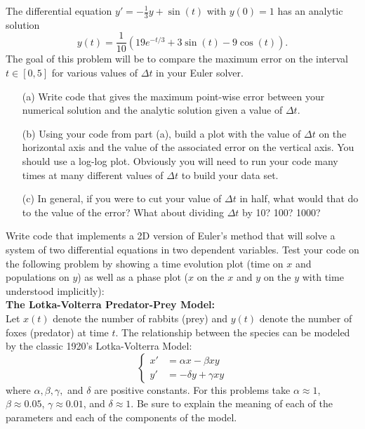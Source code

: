 \begin{problem}\label{prob:ode_error_analysis}
    The differential equation $y' = -\frac{1}{3}y + \sin(t)$ with $y(0) = 1$ has an
    analytic solution 
    \[ y(t) = \frac{1}{10} \left( 19 e^{-t/3} + 3\sin(t) - 9\cos(t) \right). \]
    The goal of this problem will be to compare the maximum error on the interval $t \in
    [0,5]$ for various values of $\Delta t$ in your Euler solver.
    \begin{enumerate}
        \item[(a)] Write code that gives the maximum point-wise error between your
            numerical solution and the analytic solution given a value of $\Delta t$.
        \item[(b)] Using your code from part (a), build a plot with the value of $\Delta
            t$ on the horizontal axis and the value of the associated error on the
            vertical axis.  You should use a log-log plot.  Obviously you will need to run
            your code many times at many different values of $\Delta t$ to build your data
            set.
        \item[(c)] In general, if you were to cut your value of $\Delta t$ in half, what
            would that do to the value of the error?  What about dividing $\Delta t$ by
            10?  100?  1000?
    \end{enumerate}
\end{problem}




\begin{problem}\label{prob:2dPredPrey}
    Write code that implements a 2D version of Euler's method that will solve a system of
    two differential equations in two dependent variables.  Test your code on the
    following problem by showing a time evolution plot (time on $x$ and populations on
    $y$) as well as a phase plot ($x$ on the $x$ and $y$ on the $y$ with time understood
    implicitly):\\
    {\bf The Lotka-Volterra Predator-Prey Model:}\\
    Let $x(t)$ denote the number of rabbits (prey) and $y(t)$ denote the number of foxes
    (predator) at time $t$.  The relationship between the species can be modeled by the
    classic 1920's Lotka-Volterra Model:
    \[ \left\{ \begin{array}{ll} x' &= \alpha x - \beta xy \\ y' &= -\delta y + \gamma xy
        \end{array} \right. \]
    where $\alpha, \beta, \gamma,$ and $\delta$ are positive constants.  For this
    problems take $\alpha \approx 1$, $\beta \approx 0.05$, $\gamma \approx 0.01$, and
    $\delta \approx 1$.  Be sure to explain the meaning of each of the parameters and each
    of the components of the model.
\end{problem}

